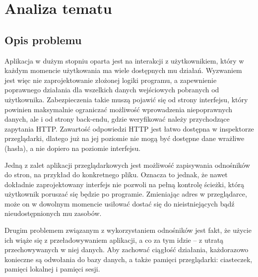 \documentclass[a4paper,twoside,12pt]{book}
\newcommand{\obcy}[1]{\emph{#1}}
\newcommand{\english}[1]{{\selectlanguage{british}\obcy{#1}}}
\begin{document}

\chapter{Analiza tematu}


\section{Opis problemu}
Aplikacja w dużym stopniu oparta jest na interakcji z użytkownikiem, który w każdym momencie użytkowania ma wiele dostępnych mu działań. Wyzwaniem jest więc nie zaprojektowanie złożonej logiki programu, a zapewnienie poprawnego działania dla wszelkich danych wejściowych pobranych od użytkownika. Zabezpieczenia takie muszą pojawić się od strony interfejsu, który powinien maksymalnie ograniczać możliwość wprowadzenia niepoprawnych danych, ale i od strony back-endu, gdzie weryfikować należy przychodzące zapytania HTTP. Zawartość odpowiedzi HTTP jest łatwo dostępna w inspektorze przeglądarki, dlatego już na jej poziomie nie mogą być dostępne dane wrażliwe (hasła), a nie dopiero na poziomie interfejsu.

Jedną z zalet aplikacji przeglądarkowych jest możliwość zapisywania odnośników do stron, na przykład do konkretnego pliku. Oznacza to jednak, że nawet dokładnie zaprojektowany interfejs nie pozwoli na pełną kontrolę ścieżki, którą użytkownik poruszać się będzie po programie. Zmieniając adres w przeglądarce, może on w dowolnym momencie usiłować dostać się do nieistniejących bądź nieudostępnionych mu zasobów.

Drugim problemem związanym z wykorzystaniem odnośników jest fakt, że użycie ich wiąże się z przeładowywaniem aplikacji, a co za tym idzie -- z utratą przechowywanych w niej danych. Aby zachować ciągłość działania, każdorazowo konieczne są odwołania do bazy danych, a także pamięci przeglądarki: ciasteczek, pamięci lokalnej i pamięci sesji.
\end{document}
